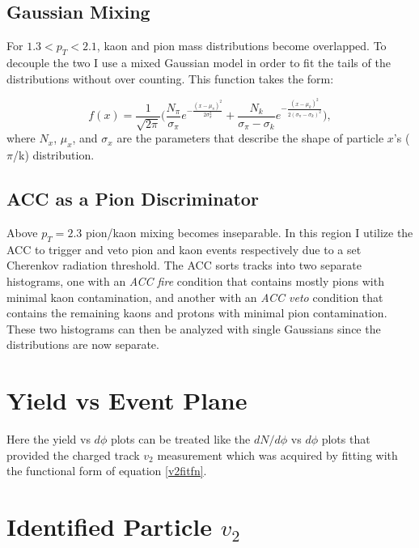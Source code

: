 \subsection{Gaussian Mixing}
For $1.3<p_T<2.1$, kaon and pion mass distributions become overlapped. To decouple the two I use a mixed Gaussian model in order to fit the tails of the distributions without over counting. This function takes the form:

\begin{equation}
f(x) = \frac{1}{\sqrt{2\pi}} \bigg( \frac{N_{\pi}}{\sigma_{\pi}} e^{-\frac{(x-\mu_{\pi})^2}{2\sigma_{\pi}^{2}}} + \frac{N_{k}}{\sigma_{\pi}-\sigma_{k}} e^{-\frac{(x-\mu_{k})^2}{2(\sigma_{\pi} - \sigma_{k})^{2}}} \bigg),
\end{equation}
where $N_{x}$, $\mu_x$, and $\sigma_x$ are the parameters that describe the shape of particle $x$'s ($\pi$/k) distribution. 

\subsection{ACC as a Pion Discriminator}
Above $p_T=2.3$ pion/kaon mixing becomes inseparable. In this region I utilize the ACC to trigger and veto pion and kaon events respectively due to a set Cherenkov radiation threshold. The ACC sorts tracks into two separate histograms, one with an \textit{ACC fire} condition that contains mostly pions with minimal kaon contamination, and another with an \textit{ACC veto} condition that contains the remaining kaons and protons with minimal pion contamination. These two histograms can then be analyzed with single Gaussians since the distributions are now separate.
\section{Yield vs Event Plane}
Here the yield vs $d\phi$ plots can be treated like the $dN/d\phi$ vs $d\phi$ plots that provided the charged track $v_2$ measurement which was acquired by fitting with the functional form of equation \ref{v2fitfn}. 
\section{Identified Particle $v_{2}$}

\pagebreak
\pagebreak
